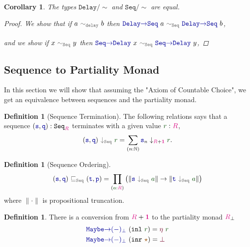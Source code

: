 \documentclass[twoside,11pt,openright]{report}
\theoremstyle{plain} %
\newtheorem*{cor}{Corollary}
\theoremstyle{definition}
\newtheorem{defn}[thm]{Definition}%
\theoremstyle{remark}
\newcommand*{\term}[1]{\textcolor{green!30!black}{#1}} %
\newcommand*{\type}[1]{\textcolor{magenta!90!black}{#1}}
\newcommand*{\unit}{\type{\textbf{1}}}
\newcommand*{\relation}[1]{\textcolor{gray!75!black}{\ensuremath{\mathtt{#1}}}}
\newcommand*{\constant}[1]{\textcolor{orange!60!black}{\ensuremath{\mathtt{#1}}}}
\newcommand*{\function}[1]{\textcolor{blue!60!black}{\ensuremath{\mathtt{#1}}}}
\newcommand*{\constructor}[1]{\textcolor{purple!60!black}{\ensuremath{\mathtt{#1}}}}
\newcommand*{\typeformer}[1]{\ensuremath{\mathtt{#1}}}
\newcommand*{\unitelem}{\constant{\star}} %
\begin{document}
\begin{cor}
  The types \(\typeformer{Delay}/\sim\) and \(\typeformer{Seq}/\sim\) are equal.
  \begin{proof}
    We show that if \(a~\relation{\sim_{delay}}~b\) then \(\function{Delay{\rightarrow}Seq}~a~\relation{\sim_{Seq}}~\function{Delay{\rightarrow}Seq}~b\), 
    \\ \\
    and we show if \(x~\relation{\sim_{Seq}}~y\) then \(\function{Seq{\rightarrow}Delay}~x~\relation{\sim_{Seq}}~\function{Seq{\rightarrow}Delay}~y\), 
  \end{proof}
\end{cor}

\subsection{Sequence to Partiality Monad}
In this section we will show that assuming the "Axiom of Countable Choice", we get an equivalence between sequences and the partiality monad.
\begin{defn}[Sequence Termination]
  The following relations says that a sequence \((\function{s},\function{q}) : \typeformer{Seq}_{\type{R}}\) terminates with a given value \(\term{r} : \type{R}\),
  \begin{equation}
    (\function{s},\function{q})~\relation{\downarrow_{\mathtt{Seq}}}~\term{r} = \sum_{(n : \mathbb{N})} \function{s}_n \downarrow_{\type{R} + \unit} \term{r}.
  \end{equation}
\end{defn}
\begin{defn}[Sequence Ordering]
  \begin{equation}
    (\function{s},\function{q})~\relation{\sqsubseteq_{\mathtt{Seq}}}~(\function{t},\function{p}) = \prod_{(\term{a} : \type{R})} \left(\|\function{s}~\relation{\downarrow_{\mathtt{Seq}}}~\term{a}\| \rightarrow \| \function{t}~\relation{\downarrow_{\mathtt{Seq}}}~\term{a}\|\right)
  \end{equation}
  where \(\| \cdot \|\) is propositional truncation.
\end{defn}
\begin{defn} There is a conversion from \(\type{R} + \unit\) to the partiality monad \(\type{R}_\bot\)
  \begin{equation}
    \begin{aligned}
      &\function{Maybe{\rightarrow}(-)_\bot}~(\mathtt{inl}~\term{r}) = \constructor{\eta}~\term{r} \\
      &\function{Maybe{\rightarrow}(-)_\bot}~(\mathtt{inr}~\unitelem) = \constructor{\bot}
    \end{aligned}
  \end{equation}
\end{defn}
\end{document}
